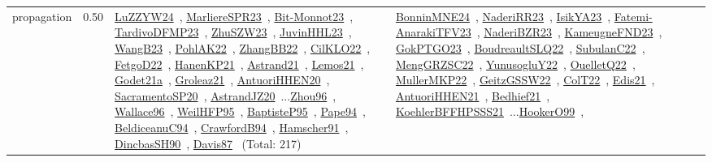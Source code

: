 {\begin{longtable}{p{3cm}r>{\raggedright\arraybackslash}p{6cm}>{\raggedright\arraybackslash}p{6cm}>{\raggedright\arraybackslash}p{8cm}}
\index{propagation}\index{CP!propagation}propagation &  0.50 & \href{../works/LuZZYW24.pdf}{LuZZYW24}~\cite{LuZZYW24}, \href{../works/MarliereSPR23.pdf}{MarliereSPR23}~\cite{MarliereSPR23}, \href{../works/Bit-Monnot23.pdf}{Bit-Monnot23}~\cite{Bit-Monnot23}, \href{../works/TardivoDFMP23.pdf}{TardivoDFMP23}~\cite{TardivoDFMP23}, \href{../works/ZhuSZW23.pdf}{ZhuSZW23}~\cite{ZhuSZW23}, \href{../works/JuvinHHL23.pdf}{JuvinHHL23}~\cite{JuvinHHL23}, \href{../works/WangB23.pdf}{WangB23}~\cite{WangB23}, \href{../works/PohlAK22.pdf}{PohlAK22}~\cite{PohlAK22}, \href{../works/ZhangBB22.pdf}{ZhangBB22}~\cite{ZhangBB22}, \href{../works/CilKLO22.pdf}{CilKLO22}~\cite{CilKLO22}, \href{../works/FetgoD22.pdf}{FetgoD22}~\cite{FetgoD22}, \href{../works/HanenKP21.pdf}{HanenKP21}~\cite{HanenKP21}, \href{../works/Astrand21.pdf}{Astrand21}~\cite{Astrand21}, \href{../works/Lemos21.pdf}{Lemos21}~\cite{Lemos21}, \href{../works/Godet21a.pdf}{Godet21a}~\cite{Godet21a}, \href{../works/Groleaz21.pdf}{Groleaz21}~\cite{Groleaz21}, \href{../works/AntuoriHHEN20.pdf}{AntuoriHHEN20}~\cite{AntuoriHHEN20}, \href{../works/SacramentoSP20.pdf}{SacramentoSP20}~\cite{SacramentoSP20}, \href{../works/AstrandJZ20.pdf}{AstrandJZ20}~\cite{AstrandJZ20}...\href{../works/Zhou96.pdf}{Zhou96}~\cite{Zhou96}, \href{../works/Wallace96.pdf}{Wallace96}~\cite{Wallace96}, \href{../works/WeilHFP95.pdf}{WeilHFP95}~\cite{WeilHFP95}, \href{../works/BaptisteP95.pdf}{BaptisteP95}~\cite{BaptisteP95}, \href{../works/Pape94.pdf}{Pape94}~\cite{Pape94}, \href{../works/BeldiceanuC94.pdf}{BeldiceanuC94}~\cite{BeldiceanuC94}, \href{../works/CrawfordB94.pdf}{CrawfordB94}~\cite{CrawfordB94}, \href{../works/Hamscher91.pdf}{Hamscher91}~\cite{Hamscher91}, \href{../works/DincbasSH90.pdf}{DincbasSH90}~\cite{DincbasSH90}, \href{../works/Davis87.pdf}{Davis87}~\cite{Davis87} (Total: 217) & \href{../works/BonninMNE24.pdf}{BonninMNE24}~\cite{BonninMNE24}, \href{../works/NaderiRR23.pdf}{NaderiRR23}~\cite{NaderiRR23}, \href{../works/IsikYA23.pdf}{IsikYA23}~\cite{IsikYA23}, \href{../works/Fatemi-AnarakiTFV23.pdf}{Fatemi-AnarakiTFV23}~\cite{Fatemi-AnarakiTFV23}, \href{../works/NaderiBZR23.pdf}{NaderiBZR23}~\cite{NaderiBZR23}, \href{../works/KameugneFND23.pdf}{KameugneFND23}~\cite{KameugneFND23}, \href{../works/GokPTGO23.pdf}{GokPTGO23}~\cite{GokPTGO23}, \href{../works/BoudreaultSLQ22.pdf}{BoudreaultSLQ22}~\cite{BoudreaultSLQ22}, \href{../works/SubulanC22.pdf}{SubulanC22}~\cite{SubulanC22}, \href{../works/MengGRZSC22.pdf}{MengGRZSC22}~\cite{MengGRZSC22}, \href{../works/YunusogluY22.pdf}{YunusogluY22}~\cite{YunusogluY22}, \href{../works/OuelletQ22.pdf}{OuelletQ22}~\cite{OuelletQ22}, \href{../works/MullerMKP22.pdf}{MullerMKP22}~\cite{MullerMKP22}, \href{../works/GeitzGSSW22.pdf}{GeitzGSSW22}~\cite{GeitzGSSW22}, \href{../works/ColT22.pdf}{ColT22}~\cite{ColT22}, \href{../works/Edis21.pdf}{Edis21}~\cite{Edis21}, \href{../works/AntuoriHHEN21.pdf}{AntuoriHHEN21}~\cite{AntuoriHHEN21}, \href{../works/Bedhief21.pdf}{Bedhief21}~\cite{Bedhief21}, \href{../works/KoehlerBFFHPSSS21.pdf}{KoehlerBFFHPSSS21}~\cite{KoehlerBFFHPSSS21}...\href{../works/HookerO99.pdf}{HookerO99}~\cite{HookerO99}, 
\end{longtable}}
